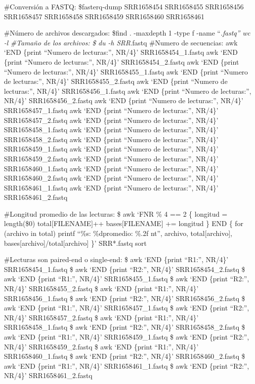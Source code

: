 \documentclass[
  letterpaper,
  DIV=11,
  numbers=noendperiod]{scrartcl}
\begin{document}
\#Conversión a FASTQ: \$fasterq-dump SRR1658454 SRR1658455 SRR1658456
SRR1658457 SRR1658458 SRR1658459 SRR1658460 SRR1658461

\#Número de archivos descargados: \$find . -maxdepth 1 -type f -name
``\emph{.fastq'' \textbar{} wc -l \#Tamaño de los archivos: \$ du -h
SRR}.fastq \#Numero de secuencias: awk `END \{print ``Numero de
lecturas:'', NR/4\}' SRR1658454\_1.fastq awk `END \{print ``Numero de
lecturas:'', NR/4\}' SRR1658454\_2.fastq awk `END \{print ``Numero de
lecturas:'', NR/4\}' SRR1658455\_1.fastq awk `END \{print ``Numero de
lecturas:'', NR/4\}' SRR1658455\_2.fastq awk `END \{print ``Numero de
lecturas:'', NR/4\}' SRR1658456\_1.fastq awk `END \{print ``Numero de
lecturas:'', NR/4\}' SRR1658456\_2.fastq awk `END \{print ``Numero de
lecturas:'', NR/4\}' SRR1658457\_1.fastq awk `END \{print ``Numero de
lecturas:'', NR/4\}' SRR1658457\_2.fastq awk `END \{print ``Numero de
lecturas:'', NR/4\}' SRR1658458\_1.fastq awk `END \{print ``Numero de
lecturas:'', NR/4\}' SRR1658458\_2.fastq awk `END \{print ``Numero de
lecturas:'', NR/4\}' SRR1658459\_1.fastq awk `END \{print ``Numero de
lecturas:'', NR/4\}' SRR1658459\_2.fastq awk `END \{print ``Numero de
lecturas:'', NR/4\}' SRR1658460\_1.fastq awk `END \{print ``Numero de
lecturas:'', NR/4\}' SRR1658460\_2.fastq awk `END \{print ``Numero de
lecturas:'', NR/4\}' SRR1658461\_1.fastq awk `END \{print ``Numero de
lecturas:'', NR/4\}' SRR1658461\_2.fastq

\#Longitud promedio de las lecturas: \$ awk `FNR \% 4 == 2 \{ longitud =
length(\$0) total{[}FILENAME{]}++ bases{[}FILENAME{]} += longitud \} END
\{ for (archivo in total) printf ``\%s\tLecturas:
\%d\tLongitud promedio: \%.2f nt\n'', archivo, total{[}archivo{]},
bases{[}archivo{]}/total{[}archivo{]} \}' SRR*.fastq \textbar{} sort

\#Lecturas son paired-end o single-end: \$ awk `END \{print ``R1:'',
NR/4\}' SRR1658454\_1.fastq \$ awk `END \{print ``R2:'', NR/4\}'
SRR1658454\_2.fastq \$ awk `END \{print ``R1:'', NR/4\}'
SRR1658455\_1.fastq \$ awk `END \{print ``R2:'', NR/4\}'
SRR1658455\_2.fastq \$ awk `END \{print ``R1:'', NR/4\}'
SRR1658456\_1.fastq \$ awk `END \{print ``R2:'', NR/4\}'
SRR1658456\_2.fastq \$ awk `END \{print ``R1:'', NR/4\}'
SRR1658457\_1.fastq \$ awk `END \{print ``R2:'', NR/4\}'
SRR1658457\_2.fastq \$ awk `END \{print ``R1:'', NR/4\}'
SRR1658458\_1.fastq \$ awk `END \{print ``R2:'', NR/4\}'
SRR1658458\_2.fastq \$ awk `END \{print ``R1:'', NR/4\}'
SRR1658459\_1.fastq \$ awk `END \{print ``R2:'', NR/4\}'
SRR1658459\_2.fastq \$ awk `END \{print ``R1:'', NR/4\}'
SRR1658460\_1.fastq \$ awk `END \{print ``R2:'', NR/4\}'
SRR1658460\_2.fastq \$ awk `END \{print ``R1:'', NR/4\}'
SRR1658461\_1.fastq \$ awk `END \{print ``R2:'', NR/4\}'
SRR1658461\_2.fastq
\end{document}
